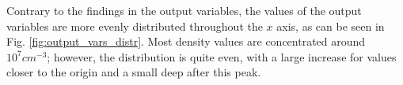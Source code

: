 Contrary to the findings in the output variables, the values of the output variables are more evenly distributed throughout the $x$ axis, as can be seen in Fig. \ref{fig:output_vars_distr}. Most density values are concentrated around $10^{7} cm^{-3}$; however, the distribution is quite even, with a large increase for values closer to the origin and a small deep after this peak.

